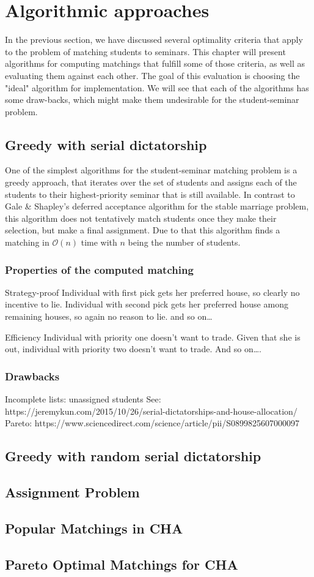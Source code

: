 \section{Algorithmic approaches}
In the previous section, we have discussed several optimality criteria that apply to the problem of matching students to seminars. This chapter will present algorithms for computing matchings that fulfill some of those criteria, as well as evaluating them against each other. The goal of this evaluation is choosing the "ideal" algorithm for implementation. We will see that each of the algorithms has some draw-backs, which might make them undesirable for the student-seminar problem. 

\subsection{Greedy with serial dictatorship}
One of the simplest algorithms for the student-seminar matching problem is a greedy approach, that iterates over the set of students and assigns each of the students to their highest-priority seminar that is still available. In contrast to Gale \& Shapley's deferred acceptance algorithm for the stable marriage problem, this algorithm does not tentatively match students once they make their selection, but make a final assignment. Due to that this algorithm finds a matching in $\mathcal{O}(n)$ time with $n$ being the number of students.

\subsubsection{Properties of the computed matching}
Strategy-proof
Individual with first pick gets her preferred house, so clearly no incentive to lie.
Individual with second pick gets her preferred house among remaining houses, so again no reason to lie.
and so on…

Efficiency
Individual with priority one doesn’t want to trade.
Given that she is out, individual with priority two doesn’t want to trade.
And so on….

\subsubsection{Drawbacks}
Incomplete lists: unassigned students
See: https://jeremykun.com/2015/10/26/serial-dictatorships-and-house-allocation/
Pareto: https://www.sciencedirect.com/science/article/pii/S0899825607000097


\subsection{Greedy with random serial dictatorship}

\subsection{Assignment Problem}

\subsection{Popular Matchings in CHA}

\subsection{Pareto Optimal Matchings for CHA}